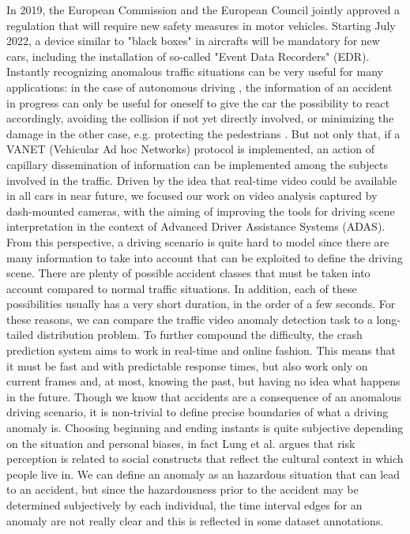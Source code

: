 In 2019, the European Commission and the European Council jointly approved a regulation that will require new safety measures in motor vehicles.
Starting July 2022, a device similar to "black boxes" in aircrafts will be mandatory for new cars, including the installation of so-called "Event Data Recorders" (EDR).
Instantly recognizing anomalous traffic situations can be very useful for many applications:
in the case of autonomous driving \cite{codevilla2019exploring}, the information of an accident in progress can only be useful for oneself to give the car the possibility to react accordingly, avoiding the collision if not yet directly involved, or minimizing the damage in the other case, e.g. protecting the pedestrians \cite{4298901}.
But not only that, if a VANET (Vehicular Ad hoc Networks) protocol \cite{fatemidokht2021efficient} is implemented, an action of capillary dissemination of information can be implemented among the subjects involved in the traffic.
Driven by the idea that real-time video could be available in all cars in near future, we focused our work on video analysis captured by dash-mounted cameras, with the aiming of improving the tools for driving scene interpretation in the context of Advanced Driver Assistance Systems (ADAS).
From this perspective, a driving scenario is quite hard to model since there are many information to take into account that can be exploited to define the driving scene.
There are plenty of possible accident classes that must be taken into account compared to normal traffic situations.
In addition, each of these possibilities usually has a very short duration, in the order of a few seconds.
For these reasons, we can compare the traffic video anomaly detection task to a long-tailed distribution problem.
To further compound the difficulty, the crash prediction system aims to work in real-time and online fashion.
This means that it must be fast and with predictable response times, but also work only on current frames and, at most, knowing the past, but having no idea what happens in the future.
Though we know that accidents are a consequence of an anomalous driving scenario, it is non-trivial to define precise boundaries of what a driving anomaly is.
Choosing beginning and ending instants is quite subjective depending on the situation and personal biases, in fact Lung et al. \cite{lund2009riskperception} argues that risk perception is related to social constructs that reflect the cultural context in which people live in.
We can define an anomaly as an hazardous situation that can lead to an accident, but since the hazardousness prior to the accident may be determined subjectively by each individual, the time interval edges for an anomaly are not really clear and this is reflected in some dataset annotations.
